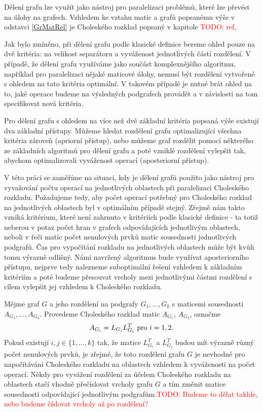 \documentclass[11pt,american,czech,oneside]{book}
\theoremstyle{plain}
\theoremstyle{definition}
\newcommand{\TODO}[1]{\textcolor{red}{TODO: #1}}
\begin{document}
Dělení grafu lze využít jako nástroj pro paralelizaci problémů, které lze převést na úlohy na grafech. Vzhledem ke vztahu matic a grafů popsanému výše v odstavci \ref{GrMatRel} je Choleského rozklad popsaný v kapitole \TODO{ref},

Jak bylo zmíněno, při dělení grafu podle klasické definice bereme ohled pouze na dvě kritéria: na velikost separátoru a vyváženost jednotlivých částí rozdělení. V případě, že dělení grafu využíváme jako součást komplexnějšího algoritmu, například pro paralelizaci nějaké maticové úlohy, nemusí být rozdělení vytvořené s ohledem na tato kritéria optimální. V takovém případě je nutné brát ohled na to, jaké operace budeme na výsledných podgrafech provádět a v závislosti na tom specifikovat nová kritéria.

Pro dělení grafu s ohledem na více než dvě základní kritéria popsaná výše existují dva základní přístupy. Můžeme hledat rozdělení grafu optimalizující všechna kritéria zároveň (apriorní přístup), nebo můžeme graf rozdělit pomocí některého ze základních algoritmů pro dělení grafu a poté vzniklé rozdělení vylepšit tak, abychom optimalizovali vyváženost operací (aposteriorní přístup).

V této práci se zaměříme na situaci, kdy je dělení grafů použito jako nástroj pro vyvažování počtu operací na jednotlivých oblastech při paralelizaci Choleského rozkladu. Požadujeme tedy, aby počet operací potřebný pro Choleského rozklad na jednotlivých oblastech byl v optimálním případě stejný. Zřejmě nám takto vzniká kritérium, které není zahrnuto v kritériích podle klasické definice - ta totiž neberou v potaz počet hran v grafech odpovídajících jednotlivým oblastech, neboli v řeči matic počet nenulových prvků matic sousednosti jednotlivých podgrafů. Čas pro vypočítání rozkladu na jednotlivých oblastech může být kvůli tomu výrazně odlišný. Námi navržený algoritmus bude využívat aposteriorního přístupu, nejprve tedy nalezneme suboptimální řešení vzhledem k základním kritériím a poté budeme přesouvat vrcholy mezi jednotlivými částmi rozdělení s cílem vylepšit jej vzhledem k Choleského rozkladu.

Mějme graf $G$ a jeho rozdělení na podgrafy $G_1, \ldots, G_k$ s maticemi sousednosti $A_{G_1}, \ldots, A_{G_k}$. Provedeme Choleského rozklad matic $A_{G_1}$, $A_{G_2}$, označme
\[
  A_{G_i} = L_{G_i}L_{G_i}^T \ {\rm pro} \ i = 1,2.
\]
Pokud existují $i,j \in \{1,\ldots,k \}$ tak, že matice $L_{G_i}^T$ a $L_{G_j}^T$ budou mít výrazně různý počet nenulových prvků, je zřejmé, že toto rozdělení grafu $G$ je nevhodné pro napočítávání Choleského rozkladu na oblastech vzhledem k vyváženosti na počet operací. Někdy pro vyvážení rozdělení za účelem Choleského rozkladu na oblastech stačí vhodně přečíslovat vrcholy grafu $G$ a tím změnit matice sousednosti odpovídající jednotlivým podgrafům.\TODO{Budeme to dělat takhle, nebo budeme číslovat vrcholy až po rozdělení?}
\end{document}
